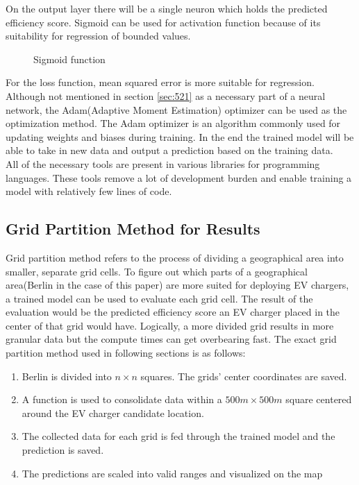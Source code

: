 On the output layer there will be a single neuron which holds the predicted efficiency score. Sigmoid can be used for activation function because of its suitability for regression of bounded values.
\begin{figure}[H]
\begin{center}

\caption{Sigmoid function\cite{wikisigmoid}}\label{fig:sigmoid}
\end{center}
\end{figure}
For the loss function, mean squared error is more suitable for regression. Although not mentioned in section \ref{sec:521} as a necessary part of a neural network, the Adam(Adaptive Moment Estimation) optimizer can be used as the optimization method. The Adam optimizer is an algorithm commonly used for updating weights and biases during training. In the end the trained model will be able to take in new data and output a prediction based on the training data.\\
All of the necessary tools are present in various libraries for programming languages. These tools remove a lot of development burden and enable training a model with relatively few lines of code. 

\subsection{Grid Partition Method for Results}\label{sec:gridmethod}
Grid partition method refers to the process of dividing a geographical area into smaller, separate grid cells. To figure out which parts of a geographical area(Berlin in the case of this paper) are more suited for deploying EV chargers, a trained model can be used to evaluate each grid cell. The result of the evaluation would be the predicted efficiency score an EV charger placed in the center of that grid would have. Logically, a more divided grid results in more granular data but the compute times can get overbearing fast. The exact grid partition method used in following sections is as follows:
\begin{enumerate}
    \item Berlin is divided into $n \times n$ squares. The grids' center coordinates are saved.
    \item A function is used to consolidate data within a $500m \times 500m$ square centered around the EV charger candidate location.
    \item The collected data for each grid is fed through the trained model and the prediction is saved.
    \item The predictions are scaled into valid ranges and visualized on the map
\end{enumerate}

